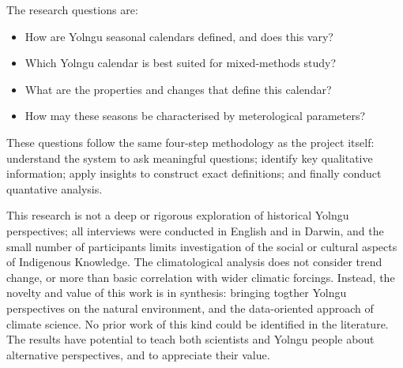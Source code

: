 The research questions are:
\begin{itemize}
\item How are Yolngu seasonal calendars defined, and does this vary?
\item Which Yolngu calendar is best suited for mixed-methods study?
\item What are the properties and changes that define this calendar?
\item How may these seasons be characterised by meterological parameters?
\end{itemize}
These questions follow the same four-step methodology as the project itself:
understand the system to ask meaningful questions; identify key
qualitative information; apply insights to construct exact definitions; and
finally conduct quantative analysis.


This research is not a deep or rigorous exploration of historical Yolngu
perspectives; all interviews were conducted in English and in Darwin, and
the small number of participants limits investigation of the social or
cultural aspects of Indigenous Knowledge.  The climatological analysis
does not consider trend change, or more than basic correlation with
wider climatic forcings.
%
Instead, the novelty and value of this work is in synthesis: bringing
togther Yolngu perspectives on the natural environment, and the
data-oriented approach of climate science.  No prior work of this kind
could be identified in the literature.  The results have potential to
teach both scientists and Yolngu people about alternative perspectives,
and to appreciate their value.

